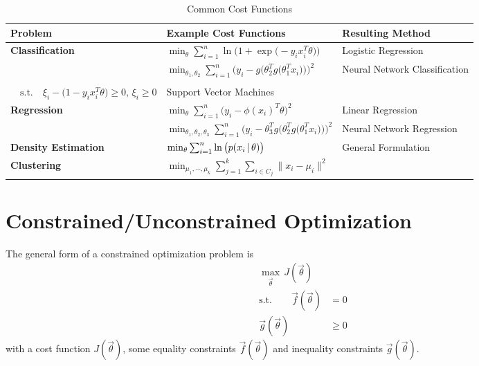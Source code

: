			\begin{table}
				\centering
				\begin{tabular}{lll}
					\textbf{Problem}            & \textbf{Example Cost Functions}                                                                                                                                            & \textbf{Resulting Method}     \\ \hline
					\textbf{Classification}     & \( \min_\theta \sum_{i = 1}^{n} \ln\Big(1 \! + \exp\big(-y_ix_i^T\theta\big)\Big) \)                                                                                       & Logistic Regression           \\
					                            & \( \min_{\theta_1, \theta_2} \sum_{i = 1}^{n} \bigg( \! y_i - g\Big( \theta_2^T g\big(\theta_1^T x_i\big) \Big) \! \bigg)^2 \)                                             & Neural Network Classification \\
					                            & \makecell[l]{\(\min_\theta \lVert\theta\rVert^2 + C \sum_{i = 1}^{n} \xi_i\) \\ \( \quad\textrm{s.t.}\quad \xi_i - \big(1 - y_ix_i^T\theta\big) \geq 0,\, \xi_i \geq 0 \)} & Support Vector Machines       \\
					\textbf{Regression}         & \( \min_\theta \sum_{i = 1}^{n} \big(y_i - \phi(x_i)^T \theta\big)^2 \)                                                                                                    & Linear Regression             \\
					                            & \( \min_{\theta_1, \theta_2, \theta_3} \sum_{i = 1}^{n} \bigg( \! y_i - \theta_3^T g\Big( \theta_2^T g\big( \theta_1^T x_i \big) \Big) \! \bigg)^2 \)                      & Neural Network Regression     \\
					\textbf{Density Estimation} & \( \min_\theta \sum_{i = 1}^{n} \ln\big(p(x_i \,\vert\, \theta)\big) \)                                                                                                       & General Formulation           \\
					\textbf{Clustering}         & \( \min_{\mu_1, \cdots, \mu_k} \sum_{j = 1}^{k} \sum_{i \in C_j} \lVert x_i - \mu_i \rVert ^2 \)
				\end{tabular}
				\caption{Common Cost Functions}
				\label{tab:costFunctions}
			\end{table}

	\section{Constrained/Unconstrained Optimization}
		The general form of a constrained optimization problem is
		\begin{align}
			\max\limits_{\vec{\theta}} \, J(\vec{\theta}) &        \\
			\textrm{s.t.} \qquad
			\vec{f}(\vec{\theta})                         & = 0    \\
			\vec{g}(\vec{\theta})                         & \geq 0
		\end{align}
		with a cost function \(J(\vec{\theta})\), some equality constraints \(\vec{f}(\vec{\theta})\) and inequality constraints \(\vec{g}(\vec{\theta})\).

